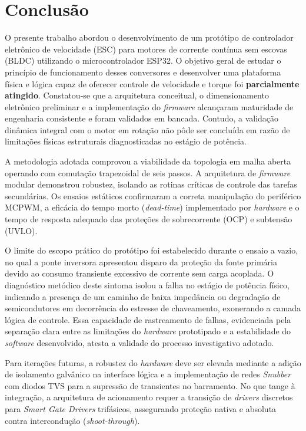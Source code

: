 \chapter{Conclusão}

O presente trabalho abordou o desenvolvimento de um protótipo de controlador eletrônico de velocidade (ESC) para motores de corrente contínua sem escovas (BLDC) utilizando o microcontrolador ESP32. O objetivo geral de estudar o princípio de funcionamento desses conversores e desenvolver uma plataforma física e lógica capaz de oferecer controle de velocidade e torque foi \textbf{parcialmente atingido}. Constatou-se que a arquitetura conceitual, o dimensionamento eletrônico preliminar e a implementação do \textit{firmware} alcançaram maturidade de engenharia consistente e foram validados em bancada. Contudo, a validação dinâmica integral com o motor em rotação não pôde ser concluída em razão de limitações físicas estruturais diagnosticadas no estágio de potência.

A metodologia adotada comprovou a viabilidade da topologia em malha aberta operando com comutação trapezoidal de seis passos. A arquitetura de \textit{firmware} modular demonstrou robustez, isolando as rotinas críticas de controle das tarefas secundárias. Os ensaios estáticos confirmaram a correta manipulação do periférico MCPWM, a eficácia do tempo morto (\textit{dead-time}) implementado por \textit{hardware} e o tempo de resposta adequado das proteções de sobrecorrente (OCP) e subtensão (UVLO).

O limite do escopo prático do protótipo foi estabelecido durante o ensaio a vazio, no qual a ponte inversora apresentou disparo da proteção da fonte primária devido ao consumo transiente excessivo de corrente sem carga acoplada. O diagnóstico metódico deste sintoma isolou a falha no estágio de potência físico, indicando a presença de um caminho de baixa impedância ou degradação de semicondutores em decorrência do estresse de chaveamento, exonerando a camada lógica de controle. Essa capacidade de rastreamento de falhas, evidenciada pela separação clara entre as limitações do \textit{hardware} prototipado e a estabilidade do \textit{software} desenvolvido, atesta a validade do processo investigativo adotado.

Para iterações futuras, a robustez do \textit{hardware} deve ser elevada mediante a adição de isolamento galvânico na interface lógica e a implementação de redes \textit{Snubber} com diodos TVS para a supressão de transientes no barramento. No que tange à integração, a arquitetura de acionamento requer a transição de \textit{drivers} discretos para \textit{Smart Gate Drivers} trifásicos, assegurando proteção nativa e absoluta contra intercondução (\textit{shoot-through}).

